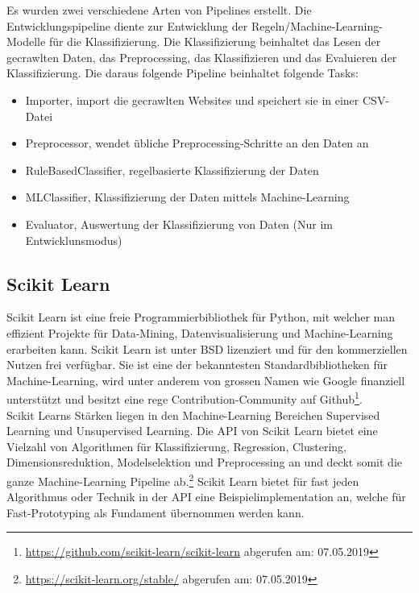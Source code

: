 Es wurden zwei verschiedene Arten von Pipelines erstellt.
Die Entwicklungspipeline diente zur Entwicklung der Regeln/Machine-Learning-Modelle für die Klassifizierung.
Die Klassifizierung beinhaltet das Lesen der gecrawlten Daten, das Preprocessing, das Klassifizieren und das Evaluieren der Klassifizierung.
Die daraus folgende Pipeline beinhaltet folgende Tasks:
\begin{itemize}
	\item Importer, import die gecrawlten Websites und speichert sie in einer CSV-Datei
	\item Preprocessor, wendet übliche Preprocessing-Schritte an den Daten an
	\item RuleBasedClassifier, regelbasierte Klassifizierung der Daten 
	\item MLClassifier, Klassifizierung der Daten mittels Machine-Learning
	\item Evaluator, Auswertung der Klassifizierung von Daten (Nur im Entwicklunsmodus)
\end{itemize}
\subsection{Scikit Learn}
Scikit Learn ist eine freie Programmierbibliothek für Python, mit welcher man effizient Projekte für Data-Mining, Datenvisualisierung und Machine-Learning erarbeiten kann.
Scikit Learn ist unter BSD lizenziert und für den kommerziellen Nutzen frei verfügbar.
Sie ist eine der bekanntesten Standardbibliotheken für Machine-Learning, wird unter anderem von grossen Namen wie Google finanziell unterstützt und besitzt eine rege Contribution-Community auf Github\footnote{\url{https://github.com/scikit-learn/scikit-learn} abgerufen am: 07.05.2019}.\\
Scikit Learns Stärken liegen in den Machine-Learning Bereichen \glqq Supervised Learning\grqq{} und \glqq Unsupervised Learning\grqq{}.
Die API von Scikit Learn bietet eine Vielzahl von Algorithmen für Klassifizierung, Regression, Clustering, Dimensionsreduktion, Modelselektion und Preprocessing an und deckt somit die ganze Machine-Learning Pipeline ab.\footnote{\url{https://scikit-learn.org/stable/} abgerufen am: 07.05.2019}
Scikit Learn bietet für fast jeden Algorithmus oder Technik in der API eine Beispielimplementation an, welche für Fast-Prototyping  als Fundament übernommen werden kann.

